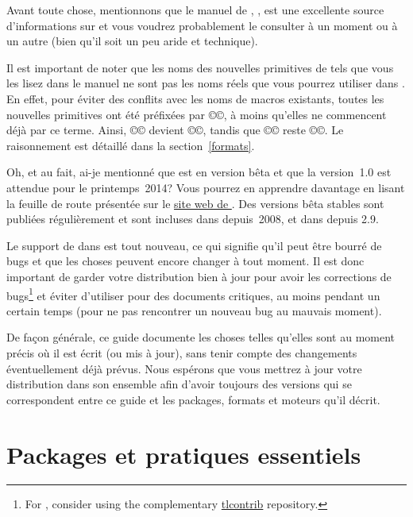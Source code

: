 \documentclass{lltxdoc}
\begin{document}
Avant toute chose, mentionnons que le manuel de \luatex, ,
est une excellente source d'informations sur \luatex et vous voudrez probablement
le consulter à un moment ou à un autre (bien qu'il soit un peu aride et technique).

Il est important de noter que les noms des nouvelles primitives de \luatex tels
que vous les lisez dans le manuel ne sont pas les noms réels que vous pourrez
utiliser dans \lualatex. En effet, pour éviter des conflits avec les noms de macros
existants, toutes les nouvelles primitives ont été préfixées par ©\luatex©,
à moins qu'elles ne commencent déjà par ce terme. Ainsi, ©\luaescapestring©
devient ©\luatexluaescapetring©, tandis que ©\luatexversion© reste ©\luatexversion©.
Le raisonnement est détaillé dans la section~\ref{formats}.

\medskip

Oh, et au fait, ai-je mentionné que \luatex est en version bêta et que
la version~1.0 est attendue pour le printemps~2014? Vous pourrez en apprendre
davantage en lisant la feuille de route présentée sur le
\href{http://luatex.org/}{site web de \luatex}. Des versions bêta stables
sont publiées régulièrement et sont incluses dans \texlive depuis~2008,
et dans \miktex depuis 2.9.

Le support de \luatex dans \latex est tout nouveau, ce qui signifie qu'il peut
être bourré de bugs et que les choses peuvent encore changer à tout moment.
Il est donc important de garder votre distribution \tex bien à jour pour avoir
les corrections de bugs\footnote{For \texlive, consider using the complementary
  \href{http://tlcontrib.metatex.org/}{tlcontrib} repository.} et éviter
d'utiliser \lualatex pour des documents critiques, au moins pendant un certain temps
(pour ne pas rencontrer un nouveau bug au mauvais moment).

De façon générale, ce guide documente les choses telles qu'elles sont au moment
précis où il est écrit (ou mis à jour), sans tenir compte des changements
éventuellement déjà prévus. Nous espérons que vous mettrez à jour votre
distribution dans son ensemble afin d'avoir toujours des versions
qui se correspondent entre ce guide et les packages, formats et moteurs
qu'il décrit.


\section{Packages et pratiques essentiels}\label{essential}
\end{document}
